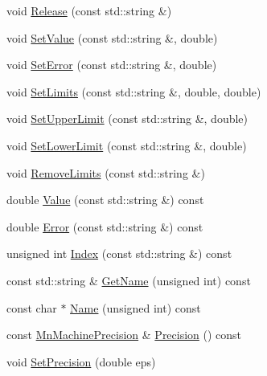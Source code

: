 \begin{DoxyCompactItemize}
void \mbox{\hyperlink{classROOT_1_1Minuit2_1_1MnUserParameters_ac178a853a9641a88a9a1412224e6e105}{Release}} (const std\+::string \&)
\item 
void \mbox{\hyperlink{classROOT_1_1Minuit2_1_1MnUserParameters_a83c0197f87bd6722f0ddfed4bf406fbe}{Set\+Value}} (const std\+::string \&, double)
\item 
void \mbox{\hyperlink{classROOT_1_1Minuit2_1_1MnUserParameters_aa3d8a9df23458438ccff06800d7c9af2}{Set\+Error}} (const std\+::string \&, double)
\item 
void \mbox{\hyperlink{classROOT_1_1Minuit2_1_1MnUserParameters_a3b22d430f97df8789a8890497c57eed4}{Set\+Limits}} (const std\+::string \&, double, double)
\item 
void \mbox{\hyperlink{classROOT_1_1Minuit2_1_1MnUserParameters_afc550532eeecdcb361f4c707032067e7}{Set\+Upper\+Limit}} (const std\+::string \&, double)
\item 
void \mbox{\hyperlink{classROOT_1_1Minuit2_1_1MnUserParameters_a3423d925b9a4b455c6130fa19f66adb4}{Set\+Lower\+Limit}} (const std\+::string \&, double)
\item 
void \mbox{\hyperlink{classROOT_1_1Minuit2_1_1MnUserParameters_a4aff83aa7fb5e9c0a7edf70f360f68fa}{Remove\+Limits}} (const std\+::string \&)
\item 
double \mbox{\hyperlink{classROOT_1_1Minuit2_1_1MnUserParameters_a4d08de604380552a826ac23ca4978767}{Value}} (const std\+::string \&) const
\item 
double \mbox{\hyperlink{classROOT_1_1Minuit2_1_1MnUserParameters_a52dd385b551b309d26d0dc30581c0b56}{Error}} (const std\+::string \&) const
\item 
unsigned int \mbox{\hyperlink{classROOT_1_1Minuit2_1_1MnUserParameters_a30523af61ec1c817b0eb060d560f9a95}{Index}} (const std\+::string \&) const
\item 
const std\+::string \& \mbox{\hyperlink{classROOT_1_1Minuit2_1_1MnUserParameters_a6061d066b67d33c98eb6d9ba36b8e269}{Get\+Name}} (unsigned int) const
\item 
const char $\ast$ \mbox{\hyperlink{classROOT_1_1Minuit2_1_1MnUserParameters_a9606a3e37135ef1f08c2fe57036d07eb}{Name}} (unsigned int) const
\item 
const \mbox{\hyperlink{classROOT_1_1Minuit2_1_1MnMachinePrecision}{Mn\+Machine\+Precision}} \& \mbox{\hyperlink{classROOT_1_1Minuit2_1_1MnUserParameters_ac10a27293b367e8b74016e625a90b661}{Precision}} () const
\item 
void \mbox{\hyperlink{classROOT_1_1Minuit2_1_1MnUserParameters_aceaa10ac8b2c83261c3cc026705ee6e0}{Set\+Precision}} (double eps)
\end{DoxyCompactItemize}


